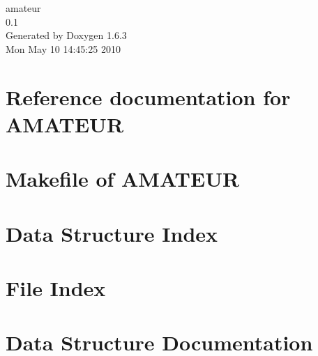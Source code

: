 \documentclass[a4paper]{book}
\begin{document}
\begin{titlepage}
\vspace*{7cm}
\begin{center}
{\Large amateur \\[1ex]\large 0.1 }\\
\vspace*{1cm}
{\large Generated by Doxygen 1.6.3}\\
\vspace*{0.5cm}
{\small Mon May 10 14:45:25 2010}\\
\end{center}
\end{titlepage}
\clearemptydoublepage
{}
\tableofcontents
\clearemptydoublepage
{}
\chapter{Reference documentation for AMATEUR}
\label{index}\hypertarget{index}{}
\chapter{Makefile of AMATEUR}
\label{AMATEUR-Makefile}

\chapter{Data Structure Index}

\chapter{File Index}

\chapter{Data Structure Documentation}































\end{document}
